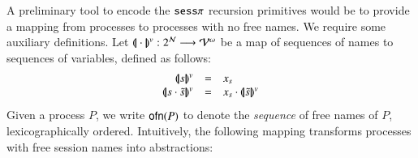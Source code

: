 A preliminary tool to encode the $\mathtt{sess}\pi$ recursion primitives would be to
provide a mapping from processes to processes with no free names.
We require some auxiliary definitions. 
Let $(\!|\!|\cdot|\!|\!)^v: 2^{\mathcal{N}} \longrightarrow \mathcal{V}^\omega$
be a map of sequences of names to sequences of variables, defined as follows:
\[
	\begin{array}{rcl}
		\vmap{s} & = & x_s \\
		\vmap{s \cat \tilde{s}} &=& x_s \cat \vmap{\tilde{s}}\\
	\end{array}
\]
Given a process $P$, we write $\mathsf{ofn}(P)$ to denote the \emph{sequence} of free names of $P$, lexicographically ordered.
Intuitively, the following mapping transforms processes with free session names into abstractions:
